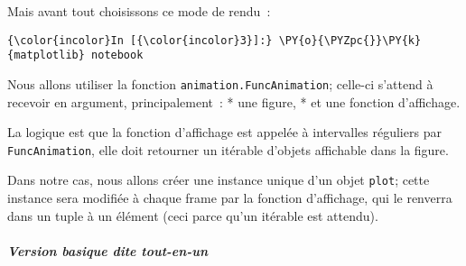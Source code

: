     Mais avant tout choisissons ce mode de rendu~:

    \begin{Verbatim}[commandchars=\\\{\}]
{\color{incolor}In [{\color{incolor}3}]:} \PY{o}{\PYZpc{}}\PY{k}{matplotlib} notebook
\end{Verbatim}


    Nous allons utiliser la fonction \texttt{animation.FuncAnimation};
celle-ci s'attend à recevoir en argument, principalement~: * une figure,
* et une fonction d'affichage.

La logique est que la fonction d'affichage est appelée à intervalles
réguliers par \texttt{FuncAnimation}, elle doit retourner un itérable
d'objets affichable dans la figure.

Dans notre cas, nous allons créer une instance unique d'un objet
\texttt{plot}; cette instance sera modifiée à chaque frame par la
fonction d'affichage, qui le renverra dans un tuple à un élément (ceci
parce qu'un itérable est attendu).

    \hypertarget{version-basique-dite-tout-en-un}{%
\subparagraph{\texorpdfstring{Version basique dite
\emph{tout-en-un}}{Version basique dite tout-en-un}}\label{version-basique-dite-tout-en-un}}

